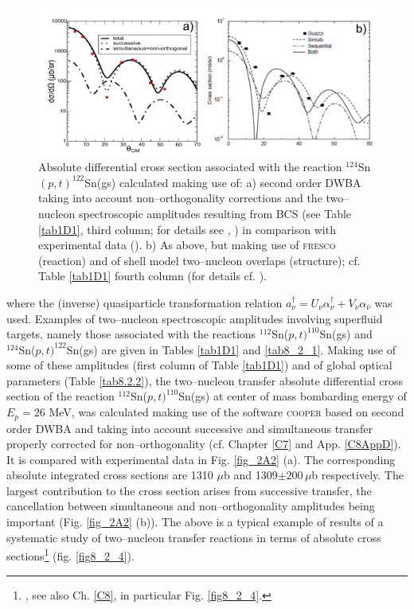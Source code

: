 \begin{figure}\label{fig2A3}
\centerline{\includegraphics*[width=\textwidth,angle=0]{nutshell/figs/fig2A3x.pdf}}
\caption{Absolute differential cross section associated with the reaction $^{124}$Sn$(p,t)^{122}$Sn(gs) calculated making use of: a) second order DWBA taking into account non--orthogonality corrections and the two--nucleon spectroscopic amplitudes resulting from BCS (see Table \ref{tab1D1}, third column; for details see \cite{Potel:13}, \cite{Potel:13b}) in comparison with experimental data (\cite{Guazzoni:11}). b) As above, but making use of \textsc{fresco} (reaction) and of shell model two--nucleon overlaps (structure); cf. Table \ref{tab1D1} fourth column (for details cf. \cite{Thompson:13}).}\label{fig_2A3}
\end{figure}
where the (inverse) quasiparticle transformation relation $a^{\dagger}_\nu=U_{\nu}\alpha^{\dagger}_{\nu}+V_{\nu}\alpha_{\bar{\nu}}$ was used. Examples of  two--nucleon spectroscopic amplitudes involving superfluid targets, namely those associated with the reactions $^{112}$Sn($p,t)^{110}$Sn(gs) and\\ $^{124}$Sn($p,t)^{122}$Sn(gs) are given in Tables \ref{tab1D1} and \ref{tab8_2_1}. Making use of some of these amplitudes (first column of Table \ref{tab1D1}) and of global optical parameters (Table \ref{tab8.2.2}), the two--nucleon transfer absolute differential cross section of the reaction $^{112}$Sn($p,t)^{110}$Sn(gs) at center of mass bombarding energy of $E_p=26$ MeV, was calculated making use of the software \textsc{cooper} based on second order DWBA and taking into account successive and simultaneous transfer properly corrected for non--orthogonality (cf. Chapter \ref{C7} and App. \ref{C8AppD}). It is compared with experimental data in Fig. \ref{fig_2A2} (a). The corresponding absolute integrated cross sections are 1310 $\mu$b and 1309$\pm 200 \,\mu$b respectively. The largest contribution to the cross section arises from successive transfer, the cancellation between simultaneous and non--orthogonality amplitudes being important (Fig. \ref{fig_2A2} (b)). The above is a typical example of results of a systematic study of two--nucleon transfer reactions in terms of absolute cross sections\footnote{\cite{Potel:13}, \cite{Potel:13b} see also Ch. \ref{C8}, in particular Fig. \ref{fig8_2_4}.} (fig. \ref{fig8_2_4}).



